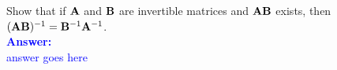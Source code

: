 \item{}
Show that if ${\bf A}$ and ${\bf B}$ are invertible matrices and ${\bf AB}$
exists, then $({\bf AB})^{-1}={\bf B}^{-1}{\bf A}^{-1}$.
\\[12pt]
\ifanswers
\textcolor{blue}{
\textbf{Answer:}\\[6pt]
answer goes here
}
\newpage
\fi
